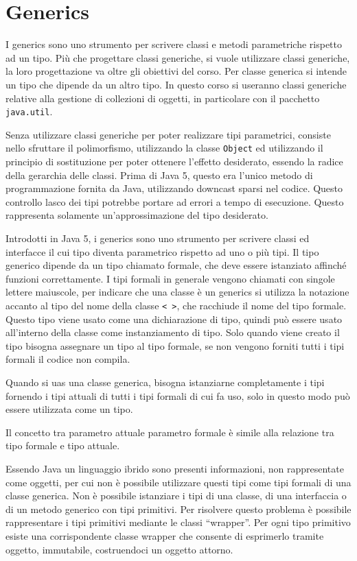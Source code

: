\documentclass{article}
\numberwithin{equation}{subsection}
\begin{document}
\clearpage

\section{Generics}

I generics sono uno strumento per scrivere classi e metodi parametriche rispetto ad un tipo. Più che progettare classi generiche, si vuole utilizzare classi generiche, la loro 
progettazione va oltre gli obiettivi del corso. Per classe generica si intende un tipo che dipende da un altro tipo. In questo corso si useranno classi generiche relative 
alla gestione di collezioni di oggetti, in particolare con il pacchetto \verb|java.util|. 

Senza utilizzare classi generiche per poter realizzare tipi parametrici, consiste nello sfruttare il polimorfismo, utilizzando la classe \verb|Object| ed utilizzando il 
principio di sostituzione per poter ottenere l'effetto desiderato, essendo la radice della gerarchia delle classi. Prima di Java 5, questo era l'unico metodo di programmazione 
fornita da Java, utilizzando downcast sparsi nel codice. Questo controllo lasco dei tipi potrebbe portare ad errori a tempo di esecuzione. 
Questo rappresenta solamente un'approssimazione del tipo desiderato. 


Introdotti in Java 5, i generics sono uno strumento per scrivere classi ed interfacce il cui tipo diventa parametrico rispetto ad uno o più tipi. Il tipo generico dipende 
da un tipo chiamato formale, che deve essere istanziato affinché funzioni correttamente. I tipi formali in generale vengono chiamati con singole lettere maiuscole, 
per indicare che una classe è un generics si utilizza la notazione accanto al tipo del nome della classe \verb|< >|, che racchiude il nome del tipo formale. 
Questo tipo viene usato come una dichiarazione di tipo, quindi può essere usato all'interno della classe come instanziamento di tipo. Solo quando viene creato il tipo 
bisogna assegnare un tipo al tipo formale, se non vengono forniti tutti i tipi formali il codice non compila. 

Quando si uas una classe generica, bisogna istanziarne completamente i tipi fornendo i tipi attuali di tutti i tipi formali di cui fa uso, solo in questo modo può essere 
utilizzata come un tipo. 

Il concetto tra parametro attuale parametro formale è simile alla relazione tra tipo formale e tipo attuale. 

Essendo Java un linguaggio ibrido sono presenti informazioni, non rappresentate come oggetti, per cui non è possibile utilizzare questi tipi come tipi formali di una classe 
generica. Non è possibile istanziare i tipi di una classe, di una interfaccia o di un metodo generico con tipi primitivi. Per risolvere questo problema è possibile 
rappresentare i tipi primitivi mediante le classi ``wrapper''. Per ogni tipo primitivo esiste una corrispondente classe wrapper che consente di esprimerlo tramite oggetto, 
immutabile, costruendoci un oggetto attorno. 
\end{document}
